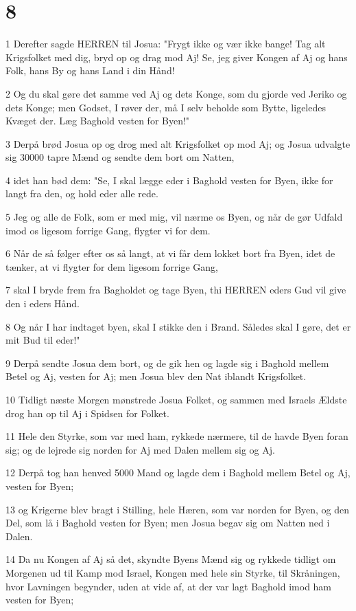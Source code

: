\chapter{8}

\par 1 Derefter sagde HERREN til Josua: "Frygt ikke og vær ikke bange! Tag alt Krigsfolket med dig, bryd op og drag mod Aj! Se, jeg giver Kongen af Aj og hans Folk, hans By og hans Land i din Hånd!
\par 2 Og du skal gøre det samme ved Aj og dets Konge, som du gjorde ved Jeriko og dets Konge; men Godset, I røver der, må I selv beholde som Bytte, ligeledes Kvæget der. Læg Baghold vesten for Byen!"
\par 3 Derpå brød Josua op og drog med alt Krigsfolket op mod Aj; og Josua udvalgte sig 30000 tapre Mænd og sendte dem bort om Natten,
\par 4 idet han bød dem: "Se, I skal lægge eder i Baghold vesten for Byen, ikke for langt fra den, og hold eder alle rede.
\par 5 Jeg og alle de Folk, som er med mig, vil nærme os Byen, og når de gør Udfald imod os ligesom forrige Gang, flygter vi for dem.
\par 6 Når de så følger efter os så langt, at vi får dem lokket bort fra Byen, idet de tænker, at vi flygter for dem ligesom forrige Gang,
\par 7 skal I bryde frem fra Bagholdet og tage Byen, thi HERREN eders Gud vil give den i eders Hånd.
\par 8 Og når I har indtaget byen, skal I stikke den i Brand. Således skal I gøre, det er mit Bud til eder!"
\par 9 Derpå sendte Josua dem bort, og de gik hen og lagde sig i Baghold mellem Betel og Aj, vesten for Aj; men Josua blev den Nat iblandt Krigsfolket.
\par 10 Tidligt næste Morgen mønstrede Josua Folket, og sammen med Israels Ældste drog han op til Aj i Spidsen for Folket.
\par 11 Hele den Styrke, som var med ham, rykkede nærmere, til de havde Byen foran sig; og de lejrede sig norden for Aj med Dalen mellem sig og Aj.
\par 12 Derpå tog han henved 5000 Mand og lagde dem i Baghold mellem Betel og Aj, vesten for Byen;
\par 13 og Krigerne blev bragt i Stilling, hele Hæren, som var norden for Byen, og den Del, som lå i Baghold vesten for Byen; men Josua begav sig om Natten ned i Dalen.
\par 14 Da nu Kongen af Aj så det, skyndte Byens Mænd sig og rykkede tidligt om Morgenen ud til Kamp mod Israel, Kongen med hele sin Styrke, til Skråningen, hvor Lavningen begynder, uden at vide af, at der var lagt Baghold imod ham vesten for Byen;
